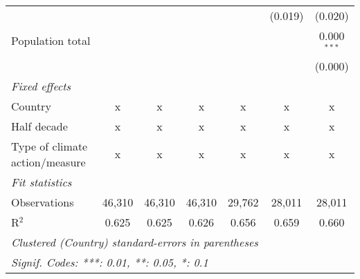 \begin{tabular}{lcccccc}
                                                                                         &                &                &                &                & (0.019)        & (0.020)\\   
   Population total                                                                      &                &                &                &                &                & 0.000$^{***}$\\   
                                                                                         &                &                &                &                &                & (0.000)\\   
   \emph{Fixed effects}\\
   Country                                                                               & x              & x              & x              & x              & x              & x\\  
   Half decade                                                                           & x              & x              & x              & x              & x              & x\\  
   Type of climate action/measure                                                        & x              & x              & x              & x              & x              & x\\  
   \midrule \emph{Fit statistics}\\
   Observations                                                                          & 46,310         & 46,310         & 46,310         & 29,762         & 28,011         & 28,011\\  
   R$^2$                                                                                 & 0.625          & 0.625          & 0.626          & 0.656          & 0.659          & 0.660\\  
   \midrule
   \multicolumn{7}{l}{\emph{Clustered (Country) standard-errors in parentheses}}\\
   \multicolumn{7}{l}{\emph{Signif. Codes: ***: 0.01, **: 0.05, *: 0.1}}\\
\end{tabular}
\par\endgroup


